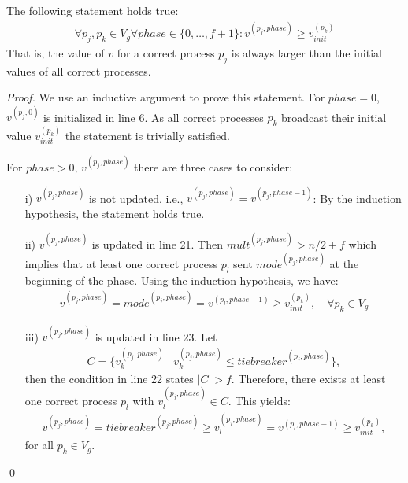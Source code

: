 \documentclass[runningheads]{llncs}
\begin{document}
\begin{lemma}\label{lemma:maxpk4}
    The following statement holds true:
    \begin{align*}
        \forall p_j, p_k \in V_g \forall phase \in \{0, \ldots, f+1\}: v^{(p_j, phase)} \geq v_{init}^{(p_k)}
    \end{align*}
    That is, the value of $v$ for a correct process $p_j$ is always larger than the initial values of all correct processes. 
\end{lemma}
\begin{proof}
    We use an inductive argument to prove this statement. For $phase = 0$, $v^{(p_j,0)}$ is initialized in line 6. As all correct processes $p_k$ broadcast their initial value $v_{init}^{(p_k)}$ the statement is trivially satisfied. 

    For $phase > 0$, $v^{(p_j,phase)}$ there are three cases to consider:
    \begin{enumerate}
        \item[i)] $v^{(p_j,phase)}$ is not updated, i.e., $v^{(p_j,phase)} = v^{(p_j,phase-1)}$: By the induction hypothesis, the statement holds true. 
        \item[ii)] $v^{(p_j,phase)}$ is updated in line 21. Then $mult^{(p_j, phase)}  > n/2+f$ which implies that at least one correct process $p_l$ sent $mode^{(p_j, phase)}$ at the beginning of the phase. Using the induction hypothesis, we have:
        \begin{align*}
            v^{(p_j,phase)} = mode^{(p_j, phase)} = v^{(p_l,phase-1)} \geq v_{init}^{(p_k)}, \quad \forall p_k \in V_g
        \end{align*} 
        \item[iii)] $v^{(p_j,phase)}$ is updated in line 23. Let
        \begin{align*}
            C = \{v_k^{(p_j,phase)} \mid v_k^{(p_j,phase)} \leq tiebreaker^{(p_j,phase)}\},
        \end{align*}
        then the condition in line 22 states $|C| > f$. Therefore, there exists at least one correct process $p_l$ with $v_l^{(p_j,phase)} \in C$. This yields:
        \begin{align*}
            v^{(p_j,phase)} = tiebreaker^{(p_j,phase)} \geq v_l^{(p_j,phase)} = v^{(p_l,phase-1)} \geq v_{init}^{(p_k)},
        \end{align*}
        for all $p_k \in V_g$.
    \end{enumerate} \qed
\end{proof}
\end{document}
